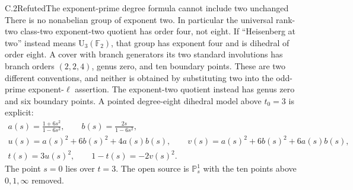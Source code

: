 \begin{result}{C.2}{Refuted}{The exponent-prime degree formula cannot include two unchanged}
There is no nonabelian group of exponent two. In particular the
universal rank-two class-two exponent-two quotient has order four,
not eight. If ``Heisenberg at two'' instead means
\(\mathrm U_3(\mathbb F_2)\), that group has exponent four and is
dihedral of order eight. A cover with branch generators its two standard
involutions has branch orders \((2,2,4)\), genus zero, and ten boundary
points. These are two different conventions, and neither is obtained
by substituting two into the odd-prime exponent-\(\ell\) assertion.
The exponent-two quotient instead has genus zero and six boundary points.
A pointed degree-eight dihedral model above \(t_0=3\) is explicit:
\[
\begin{gathered}
 a(s)=\frac{1+6s^2}{1-6s^2},\qquad
 b(s)=\frac{2s}{1-6s^2},\\
 u(s)=a(s)^2+6b(s)^2+4a(s)b(s),\qquad
 v(s)=a(s)^2+6b(s)^2+6a(s)b(s),\\
 t(s)=3u(s)^2,\qquad 1-t(s)=-2v(s)^2.
\end{gathered}
\]
The point \(s=0\) lies over \(t=3\). The open source is
\(\mathbb P^1_s\) with the ten points above \(0,1,\infty\) removed.
\end{result}
